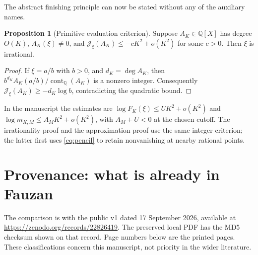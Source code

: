 \documentclass[11pt]{article}
\theoremstyle{definition}
\newtheorem{proposition}{Proposition}[section]
\theoremstyle{remark}\newtheorem*{remark}{Remark}
\newcommand{\Q}{\mathbb Q}
\newcommand{\cont}{\operatorname{cont}_{\Q}}
\begin{document}
The abstract finishing principle can now be stated without any of the
auxiliary names.
\begin{proposition}[Primitive evaluation criterion]\label{prop:criterion}
Suppose $A_K\in\Q[X]$ has degree $O(K)$, $A_K(\xi)\ne0$, and
$\mathcal J_\xi(A_K)\le-cK^2+o(K^2)$ for some $c>0$.
Then $\xi$ is irrational.
\end{proposition}
\begin{proof}
If $\xi=a/b$ with $b>0$, and $d_K=\deg A_K$, then
$b^{d_K}A_K(a/b)/\cont(A_K)$ is a nonzero integer. Consequently
$\mathcal J_\xi(A_K)\ge-d_K\log b$, contradicting the quadratic bound.
\end{proof}
In the manuscript the estimates are
$\log F_K(\xi)\le UK^2+o(K^2)$ and
$\log m_{K,M}\le A_MK^2+o(K^2)$, with $A_M+U<0$ at the chosen cutoff.
The irrationality proof and the approximation proof use the same integer
criterion; the latter first uses \eqref{eq:pencil} to retain nonvanishing at
nearby rational points.

\section{Provenance: what is already in Fauzan}\label{sec:provenance}

The comparison is with the public v1 dated 17 September 2026, available at
\url{https://zenodo.org/records/22826419}. The preserved local PDF has the
MD5 checksum shown on that record. Page numbers below are the printed pages.
These classifications concern this manuscript, not priority in the wider
literature.
\end{document}

